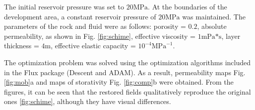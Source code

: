 \documentclass[
11pt,%
tightenlines,%
twoside,%
onecolumn,%
nofloats,%
nobibnotes,%
nofootinbib,%
superscriptaddress,%
noshowpacs,%
centertags]%
{revtex4}
\begin{document}
The initial reservoir pressure was set to $20 \text{MPa}$. At the boundaries of the development area, a constant reservoir pressure of $20 \text{MPa}$ was maintained. The parameters of the rock and fluid were as follows: porosity = $0.2$, absolute permeability, as shown in Fig. \ref{fig:schime}, effective viscosity = $1 \text{mPa*s}$, layer thickness = $4 \text{m}$, effective elastic capacity = $10^{-4} \text{MPa}^{-1}$.

The optimization problem was solved using the optimization algorithms included in the Flux package (Descent and ADAM). As a result, permeability maps Fig. \ref{fig:mob}a and maps of storativity Fig. \ref{fig:comp}b were obtained.
From the figures, it can be seen that the restored fields qualitatively reproduce the original ones \ref{fig:schime}, although they have visual differences.
\end{document}
